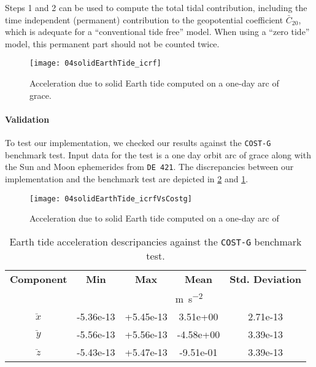 Steps 1 and 2 can be used to compute the total tidal contribution, including 
the time independent (permanent) contribution to the geopotential coefficient 
$\bar{C}_{20}$, which is adequate for a ``conventional tide free'' model. 
When using a ``zero tide'' model, this permanent part should not be counted 
twice.

\begin{figure}
  \centering
  \texttt{[image: 04solidEarthTide\_icrf]}
  \caption{Acceleration due to solid Earth tide computed on a one-day arc of \gls{grace}.}
  \label{fig:04solidEarthTide-icrf}
\end{figure}

\paragraph{Validation}\label{sssec:solid-earth-acceleration}

To test our implementation, we checked our results against the \texttt{COST-G} 
benchmark test. Input data for the test is a one day orbit arc of \gls{grace} 
along with the Sun and Moon ephemerides from \texttt{DE 421}. 
The discrepancies between our implementation and the benchmark test are depicted in 
\ref{fig:costg-benchmark-04solidEarthTide-icrf} and \ref{table:costg-benchmark-04solidEarthTide-icrf}. 

\begin{figure}
  \centering
  \texttt{[image: 04solidEarthTide\_icrfVsCostg]}
  \caption{Acceleration due to solid Earth tide computed on a one-day arc of}
  \label{fig:costg-benchmark-04solidEarthTide-icrf}
\end{figure}

\begin{table}[h!]
  \centering
  \begin{tabular}{ccccc}
      \textbf{Component} & \textbf{Min} & \textbf{Max} & \textbf{Mean} & \textbf{Std. Deviation}\\
      & \multicolumn{4}{c}{\si{\metre\per\square\second}} \\
      \hline
      $\ddot{x}$ & -5.36e-13 & +5.45e-13 &  3.51e+00 & 2.71e-13 \\
      $\ddot{y}$ & -5.56e-13 & +5.56e-13 & -4.58e+00 & 3.39e-13 \\
      $\ddot{z}$ & -5.43e-13 & +5.47e-13 & -9.51e-01 & 3.39e-13 \\
      \hline
  \end{tabular}
  \caption{Earth tide acceleration descripancies against the \texttt{COST-G} benchmark test.}
  \label{table:costg-benchmark-04solidEarthTide-icrf}
\end{table}
